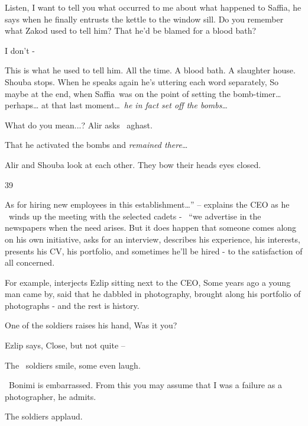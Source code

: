 \documentclass[12pt]{book}
\begin{document}
{\textquotedbl}Listen, I want to tell you what occurred to me about what happened to Saffia,{\textquotedbl} he says when
he finally entrusts the kettle to the window sill. {\textquotedbl}Do you remember what Zakod used to tell him? That
he'd be blamed for a blood bath?{\textquotedbl}

{\textquotedbl}I don't -{\textquotedbl}

{\textquotedbl}This is what he used to tell him. All the time. A blood bath. A slaughter house.{\textquotedbl} Shouba
stops. When he speaks again he's uttering each word separately, {\textquotedbl}So maybe at the end, when Saffia~was on
the point of setting the bomb-timer{\dots} perhaps{\dots} at that last moment{\dots}~\textit{he in fact set off the
bombs}{\dots}{\textquotedbl}

{\textquotedbl}What do you mean...?{\textquotedbl} Alir asks \ aghast.

{\textquotedbl}That he activated the bombs and \textit{remained there}{\dots}{\textquotedbl}

Alir and Shouba look at each other. They bow their heads eyes closed.


\bigskip

39~~~~~~~~~~~~~~~~~~~

{\textquotedbl}As for hiring new employees in this establishment{\dots}'' -- explains the CEO as he \ winds up the
meeting with the selected cadets - \ {}``we advertise in the newspapers when the need arises. But it does happen that
someone comes along on his own initiative, asks for an interview, describes his experience, his interests, presents his
CV, his portfolio, and sometimes he'll be hired - to the satisfaction of all concerned.{\textquotedbl}

{\textquotedbl}For example,{\textquotedbl} interjects Ezlip sitting next to the CEO, {\textquotedbl}Some years ago a
young man came by, said that he dabbled in photography, brought along his portfolio of photographs - and the rest is
history.{\textquotedbl}

One of the soldiers raises his hand, {\textquotedbl}Was it you?{\textquotedbl} \

Ezlip says, {\textquotedbl}Close, but not quite --{\textquotedbl}

The \ soldiers smile, some even laugh{.}

~Bonimi is embarrassed. {\textquotedbl}From this you may assume that I was a failure as a photographer,{\textquotedbl}
he admits.

The soldiers applaud.~
\end{document}
